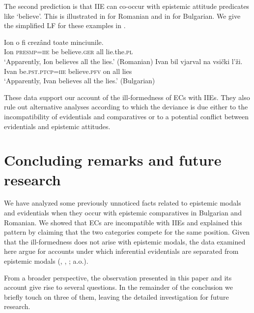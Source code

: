 \documentclass[output=paper,
]{langscibook}
\begin{document}
\noindent The second prediction is that IIE can co-occur with epistemic attitude predicates like `believe'. This is illustrated in  for Romanian and in  for Bulgarian. We give the simplified LF for these examples in . 

    \ea \ea \gll Ion o fi crezând toate minciunile.\\
    Ion \textsc{presmp=iie} be believe.\textsc{ger} all lie.the.\textsc{pl} \\
    \glt `Apparently, Ion believes all the lies.'  \hfill (Romanian) \label{bela}
	\ex \gll Ivan bil vjarval na vsički l'ži.\\
   	 Ivan be.\textsc{pst.ptcp=iie} believe.\textsc{pfv} on all lies \\
    \glt `Apparently, Ivan believes all the lies.'   \hfill (Bulgarian) \label{belb}
     \label{belc}
    \z \z 

\noindent These data support our account of the ill-formedness of ECs with IIEs. They also rule out alternative analyses according to which the deviance is due either to the incompatibility of evidentials and comparatives or to a potential conflict between evidentials and epistemic attitudes. 

\section{Concluding remarks and future research}\label{ConcludRem}

We have analyzed some previously unnoticed facts related to epistemic modals and evidentials when they occur with epistemic comparatives in Bulgarian and Romanian. We showed that ECs are incompatible with IIEs and explained this pattern by claiming that the two categories compete for the same position. Given that the ill-formedness does not arise with epistemic modals, the  data examined here argue for accounts under which inferential evidentials are separated from epistemic modals (\citealt{fall02}, \citealt{aikh14}, \citealt{murray10}; a.o.). 

From a broader perspective, the observation presented in this paper and its account give rise to several  questions. In the remainder of the conclusion we briefly touch on three of them, leaving the detailed investigation for future research. 
\end{document}
